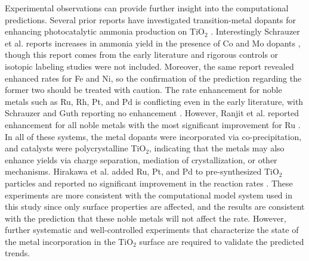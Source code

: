 Experimental observations can provide further insight into the computational predictions. Several prior reports have investigated transition-metal dopants for enhancing photocatalytic ammonia production on TiO$_2$ \cite{Schrauzer_1977, Ranjit_1996, Hirakawa_2017}. Interestingly Schrauzer et al. reports increases in ammonia yield in the presence of Co and Mo dopants \cite{Schrauzer_1977}, though this report comes from the early literature and rigorous controls \cite{Greenlee_2018} or isotopic labeling studies \cite{Andersen_2019} were not included. Moreover, the same report revealed enhanced rates for Fe and Ni, so the confirmation of the prediction regarding the former two should be treated with caution. The rate enhancement for noble metals such as Ru, Rh, Pt, and Pd is conflicting even in the early literature, with Schrauzer and Guth reporting no enhancement \cite{Schrauzer_1977}. However, Ranjit et al. reported enhancement for all noble metals with the most significant improvement for Ru \cite{Ranjit_1996}. In all of these systems, the metal dopants were incorporated via co-precipitation, and catalysts were polycrystalline TiO$_2$, indicating that the metals may also enhance yields via charge separation, mediation of crystallization, or other mechanisms\cite{Medford_2017}. Hirakawa et al. added Ru, Pt, and Pd to pre-synthesized TiO$_2$ particles and reported no significant improvement in the reaction rates \cite{Hirakawa_2017}. These experiments are more consistent with the computational model system used in this study since only surface properties are affected, and the results are consistent with the prediction that these noble metals will not affect the rate. However, further systematic and well-controlled experiments that characterize the state of the metal incorporation in the TiO$_2$ surface are required to validate the predicted trends.








